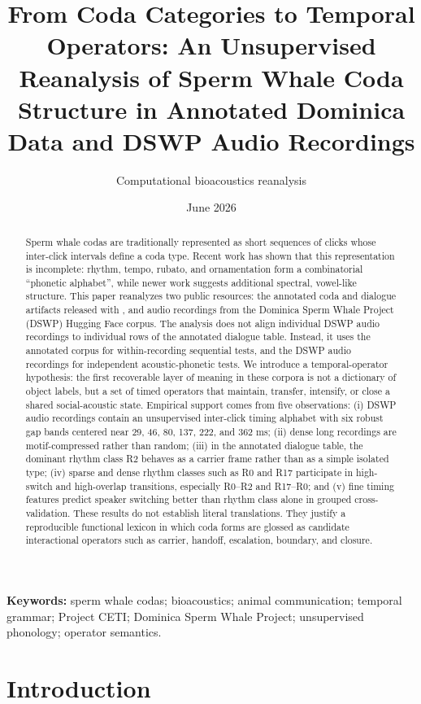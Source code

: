 \documentclass[11pt]{article}
\title{From Coda Categories to Temporal Operators: An Unsupervised Reanalysis of Sperm Whale Coda Structure in Annotated Dominica Data and DSWP Audio Recordings}
\author{Computational bioacoustics reanalysis}
\date{June 2026}
\begin{document}
\maketitle

\begin{abstract}
Sperm whale codas are traditionally represented as short sequences of clicks whose inter-click intervals define a coda type. Recent work has shown that this representation is incomplete: rhythm, tempo, rubato, and ornamentation form a combinatorial ``phonetic alphabet'', while newer work suggests additional spectral, vowel-like structure. This paper reanalyzes two public resources: the annotated coda and dialogue artifacts released with , and audio recordings from the Dominica Sperm Whale Project (DSWP) Hugging Face corpus. The analysis does not align individual DSWP audio recordings to individual rows of the annotated dialogue table. Instead, it uses the annotated corpus for within-recording sequential tests, and the DSWP audio recordings for independent acoustic-phonetic tests. We introduce a temporal-operator hypothesis: the first recoverable layer of meaning in these corpora is not a dictionary of object labels, but a set of timed operators that maintain, transfer, intensify, or close a shared social-acoustic state. Empirical support comes from five observations: (i) DSWP audio recordings contain an unsupervised inter-click timing alphabet with six robust gap bands centered near 29, 46, 80, 137, 222, and 362 ms; (ii) dense long recordings are motif-compressed rather than random; (iii) in the annotated dialogue table, the dominant rhythm class R2 behaves as a carrier frame rather than as a simple isolated type; (iv) sparse and dense rhythm classes such as R0 and R17 participate in high-switch and high-overlap transitions, especially R0--R2 and R17--R0; and (v) fine timing features predict speaker switching better than rhythm class alone in grouped cross-validation. These results do not establish literal translations. They justify a reproducible functional lexicon in which coda forms are glossed as candidate interactional operators such as carrier, handoff, escalation, boundary, and closure.
\end{abstract}

\noindent\textbf{Keywords:} sperm whale codas; bioacoustics; animal communication; temporal grammar; Project CETI; Dominica Sperm Whale Project; unsupervised phonology; operator semantics.

\section{Introduction}
\end{document}
